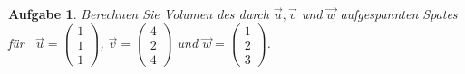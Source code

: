 \documentclass[12pt]{article}
\newtheorem{exercise}[satz]{Aufgabe}
\begin{document}
\vspace{0.1cm}

\begin{exercise}
  Berechnen Sie Volumen des durch $\vec{u}, \vec{v}$ und $\vec{w}$ aufgespannten Spates f\"ur \,
  $\vec{u}=\left(\begin{array}{r} 1 \\ 1 \\ 1 \end{array}\right)$,
  $\vec{v}=\left(\begin{array}{r} 4 \\ 2 \\ 4 \end{array}\right)$ und
  $\vec{w}=\left(\begin{array}{r} 1 \\ 2 \\ 3 \end{array}\right)$.
\end{exercise}
\end{document}
